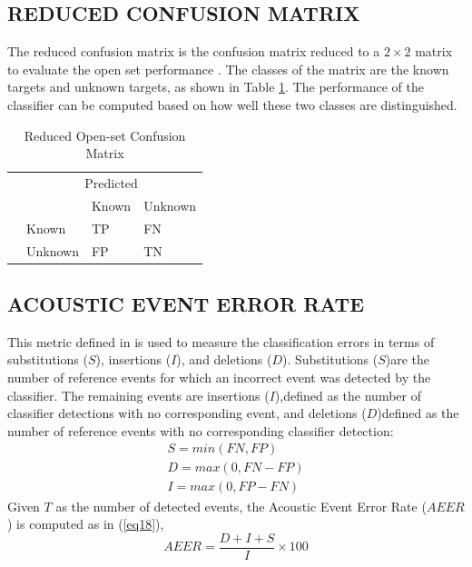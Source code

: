 \documentclass{ieeeaccess}
\begin{document}
\subsection{REDUCED CONFUSION MATRIX}
The reduced confusion matrix is the confusion matrix reduced to a $ 2\times2 $ matrix to evaluate the open set performance \cite{23}. The classes of the matrix are the known targets and unknown targets, as shown in Table \ref{tab:table1}. The performance of the classifier can be computed based on how well these two classes are distinguished.  
\begin{table}[h]
	\caption{Reduced Open-set Confusion Matrix}
	\centering
\begin{tabular}{m{1.5em} m{5em} m{5em} m{5em}}
 	& \multicolumn{3}{c}{Predicted}\\
 	\parbox[t]{2mm}{} & 
 	&  Known&  Unknown\\ 
 	&  Known &TP&  FN\\ 
 	&  Unknown &  FP&TN\\ 
\end{tabular}
\label{tab:table1}
\end{table}

\subsection{ACOUSTIC EVENT ERROR RATE}
 This metric defined in \cite{33} is used to measure the classification errors in terms of substitutions  ($ S $), insertions ($ I $), and deletions ($ D $). Substitutions ($ S $)are the number of reference events for which an incorrect event was detected by the classifier. The remaining events are insertions ($ I $),defined as the number of classifier detections with no corresponding event, and deletions ($ D $)defined as the number of reference events with no corresponding classifier detection:
\begin{equation}
	\begin{matrix}
		S= min (FN,FP)\\
		D=max(0,FN-FP)\\
		I = max(0,FP-FN)
	\end{matrix}
	\label{eq17}
\end{equation} 
Given $ T $ as the number of detected events, the Acoustic Event Error Rate ($AEER$) is computed as in (\ref{eq18}),
\begin{equation}
	AEER=\frac{D+I+S}{I}\times 100
	\label{eq18}
\end{equation} 
\end{document}
